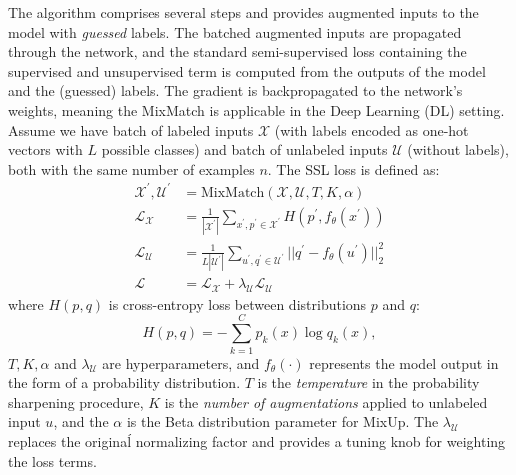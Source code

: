 The algorithm comprises several steps and provides augmented inputs to the model with \textit{guessed} labels. The batched augmented inputs are propagated 
through the network, and the standard semi-supervised loss containing the supervised and unsupervised term is computed from the outputs of the model and the (guessed) 
labels. The gradient is backpropagated to the network's weights, meaning the MixMatch is applicable in the Deep Learning (DL) setting.
Assume we have batch of labeled inputs $\mathcal{X}$ (with labels encoded as one-hot vectors with $L$ possible classes) and batch of unlabeled inputs $\mathcal{U}$ 
(without labels), both with the same number of examples $n$. The SSL loss is defined as:
\begin{align*}
    \mathcal{X}^\prime,\mathcal{U}^\prime &= \text{MixMatch}(\mathcal{X}, \mathcal{U}, T, K, \alpha)\\
    \mathcal{L}_{\mathcal{X}} &= \frac{1}{|\mathcal{X}^\prime|}\sum_{x^\prime,p^\prime \in \mathcal{X}^\prime} H(p^\prime,f_\theta(x^\prime)) \\
    \mathcal{L}_{\mathcal{U}} &= \frac{1}{L|\mathcal{U}^\prime|}\sum_{u^\prime,q^\prime \in \mathcal{U}^\prime} ||q^\prime - f_\theta(u^\prime)||_2^2 \\
    \mathcal{L} &= \mathcal{L}_{\mathcal{X}} + \lambda_\mathcal{U} \mathcal{L}_{\mathcal{U}}
\end{align*}
where $H(p,q)$ is cross-entropy loss between distributions $p$ and $q$:
\begin{equation*}
    H(p,q) = -\sum_{k=1}^{C} p_k(x) \log q_k(x),
\end{equation*}
$T, K, \alpha$ and $\lambda_\mathcal{U}$ are hyperparameters, and $f_\theta(\cdot)$ represents the 
model output in the form of a probability distribution. $T$ is the \textit{temperature} in the probability sharpening procedure, $K$ is the \textit{number of augmentations} applied to
unlabeled input $u$, and the $\alpha$ is the Beta distribution parameter for MixUp. The $\lambda_\mathcal{U}$ replaces the originaĺ normalizing factor and provides a tuning knob for 
weighting the loss terms. 

